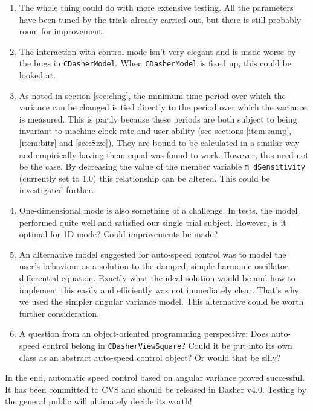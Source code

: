 \documentclass[a4paper,11pt,notitlepage]{article}
\begin{document}
\begin{enumerate}
\item The whole thing could do with more extensive testing. All the
parameters have been tuned by the trials already carried out, but
there is still probably room for improvement.

\item The interaction with control mode isn't very elegant and is made
worse by the bugs in \texttt{CDasherModel}. When \texttt{CDasherModel}
is fixed up, this could be looked at.

\item As noted in section \ref{sec:chng}, the minimum time period over
which the variance can be changed is tied directly to the period over
which the variance is measured. This is partly because these periods
are both subject to being invariant to machine clock rate and user
ability (see sections \ref{item:samp}, \ref{item:bitr} and
\ref{sec:Size}). They are bound to be calculated in a similar way and
empirically having them equal was found to work. However, this need not be the
case. By decreasing the value of the member variable
\texttt{m\_dSensitivity} (currently set to 1.0) this relationship can
be altered. This could be investigated further.

\item One-dimensional mode is also something of a challenge. In tests,
the model performed quite well and satisfied our single trial
subject. However, is it optimal for 1D mode? Could improvements be
made?

\item An alternative model suggested for auto-speed control was to
model the user's behaviour as a solution to the damped, simple
harmonic oscillator differential equation. Exactly what the ideal
solution would be and how to implement this easily and efficiently was
not immediately clear. That's why we used the simpler angular variance
model. This alternative could be worth further consideration.

\item A question from an object-oriented programming perspective: Does
auto-speed control belong in \texttt{CDasherViewSquare}? Could it be
put into its own class as an abstract auto-speed control object? Or
would that be silly?

\end{enumerate}

In the end, automatic speed control based on angular variance proved
successful. It has been committed to CVS and should be released in
Dasher v4.0. Testing by the general public will ultimately decide its
worth!
\end{document}
